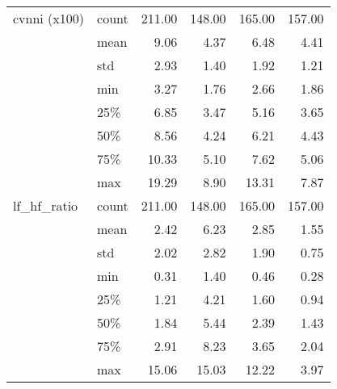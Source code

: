 \begin{tabular}{llrrrr}
cvnni (x100) & count &  211.00 &  148.00 &  165.00 &  157.00 \\
            & mean &    9.06 &    4.37 &    6.48 &    4.41 \\
            & std &    2.93 &    1.40 &    1.92 &    1.21 \\
            & min &    3.27 &    1.76 &    2.66 &    1.86 \\
            & 25\% &    6.85 &    3.47 &    5.16 &    3.65 \\
            & 50\% &    8.56 &    4.24 &    6.21 &    4.43 \\
            & 75\% &   10.33 &    5.10 &    7.62 &    5.06 \\
            & max &   19.29 &    8.90 &   13.31 &    7.87 \\
lf\_hf\_ratio & count &  211.00 &  148.00 &  165.00 &  157.00 \\
            & mean &    2.42 &    6.23 &    2.85 &    1.55 \\
            & std &    2.02 &    2.82 &    1.90 &    0.75 \\
            & min &    0.31 &    1.40 &    0.46 &    0.28 \\
            & 25\% &    1.21 &    4.21 &    1.60 &    0.94 \\
            & 50\% &    1.84 &    5.44 &    2.39 &    1.43 \\
            & 75\% &    2.91 &    8.23 &    3.65 &    2.04 \\
            & max &   15.06 &   15.03 &   12.22 &    3.97 \\
\bottomrule
\end{tabular}
